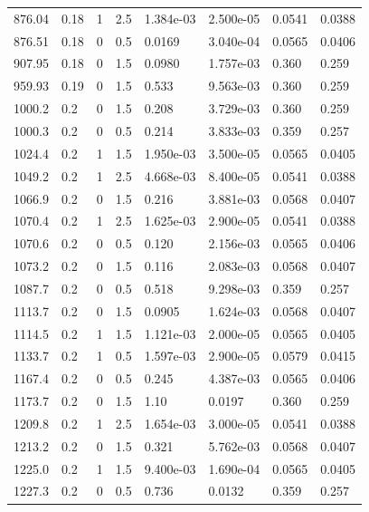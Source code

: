 \documentclass[preview]{standalone}
\begin{document}
{{{\begin{tabular}{L{1.2cm}C{1.2cm} C{0.3cm}C{0.5cm} C{1.4cm}C{1.4cm} C{1.4cm}C{1.4cm}}
  876.04  &  0.18  & 1     & 2.5 &  1.384e-03  & 2.500e-05  & 0.0541 &  0.0388   \\ 
  876.51  &  0.18  & 0     & 0.5 &  0.0169  & 3.040e-04  & 0.0565 &  0.0406   \\ 
  907.95  &  0.18  & 0     & 1.5 &  0.0980  & 1.757e-03  & 0.360 &  0.259   \\ 
  959.93  &  0.19  & 0     & 1.5 &  0.533  & 9.563e-03  & 0.360 &  0.259   \\ 
  1000.2  &   0.2  & 0     & 1.5 &  0.208  & 3.729e-03  & 0.360 &  0.259   \\ 
  1000.3  &   0.2  & 0     & 0.5 &  0.214  & 3.833e-03  & 0.359 &  0.257   \\ 
  1024.4  &   0.2  & 1     & 1.5 &  1.950e-03  & 3.500e-05  & 0.0565 &  0.0405   \\ 
  1049.2  &   0.2  & 1     & 2.5 &  4.668e-03  & 8.400e-05  & 0.0541 &  0.0388   \\ 
  1066.9  &   0.2  & 0     & 1.5 &  0.216  & 3.881e-03  & 0.0568 &  0.0407   \\ 
  1070.4  &   0.2  & 1     & 2.5 &  1.625e-03  & 2.900e-05  & 0.0541 &  0.0388   \\ 
  1070.6  &   0.2  & 0     & 0.5 &  0.120  & 2.156e-03  & 0.0565 &  0.0406   \\ 
  1073.2  &   0.2  & 0     & 1.5 &  0.116  & 2.083e-03  & 0.0568 &  0.0407   \\ 
  1087.7  &   0.2  & 0     & 0.5 &  0.518  & 9.298e-03  & 0.359 &  0.257   \\ 
  1113.7  &   0.2  & 0     & 1.5 &  0.0905  & 1.624e-03  & 0.0568 &  0.0407   \\ 
  1114.5  &   0.2  & 1     & 1.5 &  1.121e-03  & 2.000e-05  & 0.0565 &  0.0405   \\ 
  1133.7  &   0.2  & 1     & 0.5 &  1.597e-03  & 2.900e-05  & 0.0579 &  0.0415   \\ 
  1167.4  &   0.2  & 0     & 0.5 &  0.245  & 4.387e-03  & 0.0565 &  0.0406   \\ 
  1173.7  &   0.2  & 0     & 1.5 &  1.10  & 0.0197  & 0.360 &  0.259   \\ 
  1209.8  &   0.2  & 1     & 2.5 &  1.654e-03  & 3.000e-05  & 0.0541 &  0.0388   \\ 
  1213.2  &   0.2  & 0     & 1.5 &  0.321  & 5.762e-03  & 0.0568 &  0.0407   \\ 
  1225.0  &   0.2  & 1     & 1.5 &  9.400e-03  & 1.690e-04  & 0.0565 &  0.0405   \\ 
  1227.3  &   0.2  & 0     & 0.5 &  0.736  & 0.0132  & 0.359 &  0.257   \\ 

\end{tabular}}}}
\end{document}
